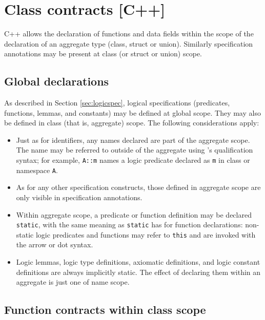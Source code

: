 \section{Class contracts [C++]}
\label{sec:class-contracts}

C++ allows the declaration of functions and data fields within
the scope of the declaration of an aggregate type (class, struct or union). Similarly \NAME{} specification annotations
may be present at class (or struct or union) scope.

\subsection{Global declarations}

As described in Section \ref{sec:logicspec}, logical specifications (predicates, functions, lemmas, and constants) may be defined at global scope. They may also be defined in class (that is, aggregate) scope. The following considerations apply:
\begin{itemize}
	\item Just as for \lang{} identifiers, any names 
	declared are part of the aggregate scope. The name may
	be referred to outside of the aggregate using \lang's 
	qualification syntax; for example, \lstinline|A::m| names a 
	logic predicate declared as \lstinline|m| in class
	or namespace \lstinline|A|.
	\item As for any other specification constructs, those defined in aggregate scope are only visible in specification annotations.
	\item Within aggregate scope, a predicate or function definition may be
	declared \lstinline|static|, with the same meaning as 
	\lstinline|static| has for \lang{} function 
	declarations: non-static logic predicates and functions
	may refer to \lstinline|this| and are invoked with the
	\lang{} arrow or dot syntax.

	\item Logic lemmas, logic type definitions, axiomatic definitions, and logic constant definitions are always implicitly static. The effect of declaring them within an aggregate is just one of name scope.
\end{itemize}



\subsection{Function contracts within class scope}

